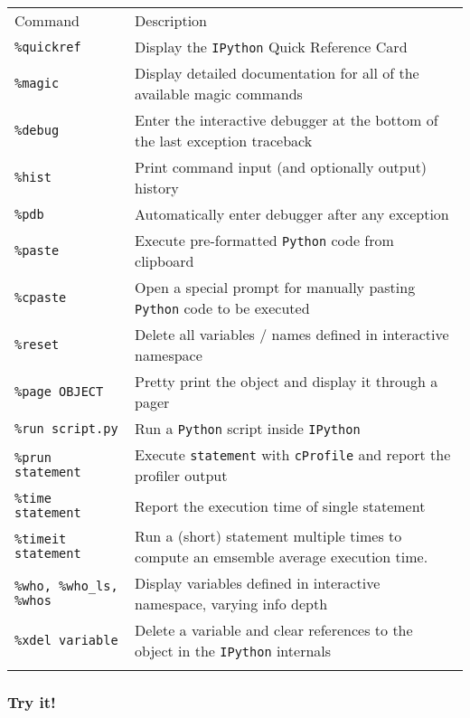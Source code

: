 \documentclass{article}
\begin{document}
\begin{longtable}[c]{@{}ll@{}}
\toprule\addlinespace
Command & Description
\\\addlinespace
\midrule\endhead
\texttt{\%quickref} & Display the \texttt{IPython} Quick Reference Card
\\\addlinespace
\texttt{\%magic} & Display detailed documentation for all of the
available magic commands
\\\addlinespace
\texttt{\%debug} & Enter the interactive debugger at the bottom of the
last exception traceback
\\\addlinespace
\texttt{\%hist} & Print command input (and optionally output) history
\\\addlinespace
\texttt{\%pdb} & Automatically enter debugger after any exception
\\\addlinespace
\texttt{\%paste} & Execute pre-formatted \texttt{Python} code from
clipboard
\\\addlinespace
\texttt{\%cpaste} & Open a special prompt for manually pasting
\texttt{Python} code to be executed
\\\addlinespace
\texttt{\%reset} & Delete all variables / names defined in interactive
namespace
\\\addlinespace
\texttt{\%page OBJECT} & Pretty print the object and display it through
a pager
\\\addlinespace
\texttt{\%run script.py} & Run a \texttt{Python} script inside
\texttt{IPython}
\\\addlinespace
\texttt{\%prun statement} & Execute \texttt{statement} with
\texttt{cProfile} and report the profiler output
\\\addlinespace
\texttt{\%time statement} & Report the execution time of single
statement
\\\addlinespace
\texttt{\%timeit statement} & Run a (short) statement multiple times to
compute an emsemble average execution time.
\\\addlinespace
\texttt{\%who, \%who\_ls, \%whos} & Display variables defined in
interactive namespace, varying info depth
\\\addlinespace
\texttt{\%xdel variable} & Delete a variable and clear references to the
object in the \texttt{IPython} internals
\\\addlinespace
\bottomrule
\end{longtable}

    \subsubsection{Try it!}\label{try-it}
\end{document}
